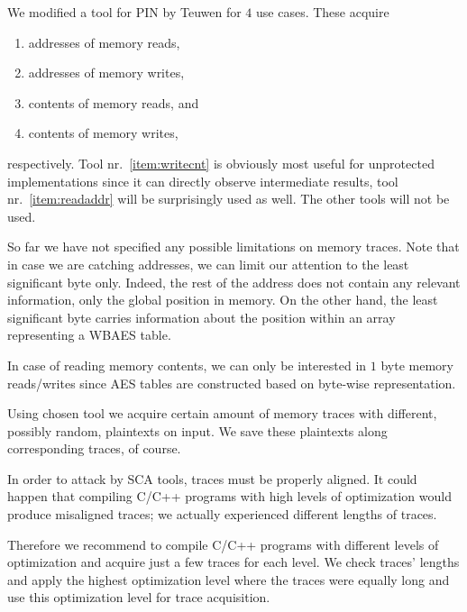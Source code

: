 We modified a tool for PIN by Teuwen \cite{teuwen2015movfuscator} for $4$ use cases. These acquire
\begin{enumerate}
	\item addresses of memory reads, \label{item:readaddr}
	\item addresses of memory writes,   %
	\item contents of memory reads, and   %
	\item contents of memory writes, \label{item:writecnt}
\end{enumerate}
respectively. Tool nr.\ \ref{item:writecnt} is obviously most useful for unprotected implementations since it can directly observe intermediate results, tool nr.\ \ref{item:readaddr} will be surprisingly used as well. The other tools will not be used.

\begin{note}
\label{note:lsb}
	So far we have not specified any possible limitations on memory traces. Note that in case we are catching addresses, we can limit our attention to the least significant byte only. Indeed, the rest of the address does not contain any relevant information, only the global position in memory. On the other hand, the least significant byte carries information about the position within an array representing a WBAES table.
	
	In case of reading memory contents, we can only be interested in $1$ byte memory reads/writes since AES tables are constructed based on byte-wise representation.
\end{note}

Using chosen tool we acquire certain amount of memory traces with different, possibly random, plaintexts on input. We save these plaintexts along corresponding traces, of course.

\begin{note}
\label{note:optim}
	In order to attack by SCA tools, traces must be properly aligned. It could happen that compiling C/C++ programs with high levels of optimization would produce misaligned traces; we actually experienced different lengths of traces.
	
	Therefore we recommend to compile C/C++ programs with different levels of optimization and acquire just a few traces for each level. We check traces' lengths and apply the highest optimization level where the traces were equally long and use this optimization level for trace acquisition.
\end{note}

